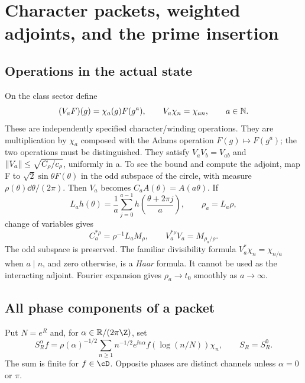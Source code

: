 \section{Character packets, weighted adjoints, and the prime insertion}\label{sec:characters}
\subsection{Operations in the actual state}
On the class sector define
\begin{equation}
(V_aF)(g)=\chi_a(g)F(g^a),\qquad V_a\chi_n=\chi_{an},
\qquad a\in\mathbb N.
\end{equation}
These are independently specified character/winding operations. They
are multiplication by $\chi_a$ composed with the Adams operation
$F(g)\mapsto F(g^a)$; the two operations must be distinguished. They
satisfy $V_aV_b=V_{ab}$ and
$\left\lVert V_a\right\rVert\le\sqrt{C_\rho/c_\rho}$, uniformly in a.
To see the bound and compute the adjoint, map F to
$\sqrt2\sin\theta F(\theta)$ in the odd subspace of the circle, with
measure $\rho(\theta)\dd\theta/(2\pi)$. Then $V_a$ becomes
$C_aA(\theta)=A(a\theta)$. If
\begin{equation}
L_ah(\theta)=\frac1a\sum_{j=0}^{a-1}
h\left(\frac{\theta+2\pi j}{a}\right),\qquad \rho_a=L_a\rho,
\end{equation}
change of variables gives
\begin{equation}\label{eq:weighted-adjoint}
C_a^{*\rho}=\rho^{-1}L_aM_\rho,\qquad
V_a^{*\nu}V_a=M_{\rho_a/\rho}.
\end{equation}
The odd subspace is preserved. The familiar divisibility formula
$V_a^*\chi_n=\chi_{n/a}$ when $a\mid n$, and zero otherwise, is a
\emph{Haar} formula. It cannot be used as the interacting adjoint.
Fourier expansion gives $\rho_a\to t_0$ smoothly as $a\to\infty$.

\subsection{All phase components of a packet}
Put $N=e^R$ and, for $\alpha\in\R/(2\pi\Z)$, set
\begin{equation}\label{eq:phase-packets}
S_R^\alpha f=\rho(\alpha)^{-1/2}
\sum_{n\ge1}n^{-1/2}e^{\ii n\alpha}f(\log(n/N))\chi_n,
\qquad S_R=S_R^0 .
\end{equation}
The sum is finite for $f\in\cD$. Opposite phases are distinct channels
unless $\alpha=0$ or $\pi$.

